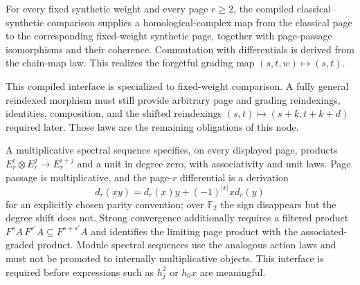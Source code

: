 \begin{definition}
  \label{def:reindexed-ss-morphism}
  \notready
  For every fixed synthetic weight and every page $r\geq2$, the compiled
  classical--synthetic comparison supplies a homological-complex map from the
  classical page to the corresponding fixed-weight synthetic page, together
  with page-passage isomorphisms and their coherence.  Commutation with
  differentials is derived from the chain-map law.  This realizes the
  forgetful grading map $(s,t,w)\mapsto(s,t)$.

  This compiled interface is specialized to fixed-weight comparison.  A fully
  general reindexed morphism must still provide arbitrary page and grading
  reindexings, identities, composition, and the shifted reindexings
  $(s,t)\mapsto(s+k,t+k+d)$ required later.  Those laws are the remaining
  obligations of this node.
\end{definition}

\begin{definition}
  \label{def:multiplicative-ss}
  \notready
  A multiplicative spectral sequence specifies, on every displayed page,
  products $E_r^i\otimes E_r^j\to E_r^{i+j}$ and a unit in degree zero, with
  associativity and unit laws.  Page passage is multiplicative, and the
  page-$r$ differential is a derivation
  \[
    d_r(xy)=d_r(x)y+(-1)^{|x|}x d_r(y)
  \]
  for an explicitly chosen parity convention; over $\mathbb F_2$ the sign
  disappears but the degree shift does not.  Strong convergence additionally
  requires a filtered product $F^sA\,F^{s'}A\subseteq F^{s+s'}A$ and identifies
  the limiting page product with the associated-graded product.  Module
  spectral sequences use the analogous action laws and must not be promoted
  to internally multiplicative objects.  This interface is required before
  expressions such as $h_j^2$ or $h_0x$ are meaningful.
\end{definition}

